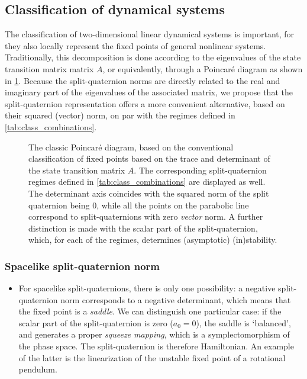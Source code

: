 \subsection{Classification of dynamical systems}
The classification of two-dimensional linear dynamical systems is important, for they also locally represent the fixed points of general nonlinear systems. Traditionally, this decomposition is done according to the eigenvalues of the state transition matrix matrix $A$, or equivalently, through a Poincaré diagram as shown in \cref{fig:poincare_diagram}. Because the split-quaternion norms are directly related to the real and imaginary part of the eigenvalues of the associated matrix, we propose that the split-quaternion representation offers a more convenient alternative, based on their squared (vector) norm, on par with the regimes defined in \cref{tab:class_combinations}.
\begin{figure}[ht!]
    \centering
    
    \caption{The classic Poincaré diagram, based on the conventional classification of fixed points based on the trace and determinant of the state transition matrix $A$. The corresponding split-quaternion regimes defined in \cref{tab:class_combinations} are displayed as well. The determinant axis coincides with the squared norm of the split quaternion being 0, while all the points on the parabolic line correspond to split-quaternions with zero \emph{vector} norm. A further distinction is made with the scalar part of the split-quaternion, which, for each of the regimes, determines (asymptotic) (in)stability.}
    \label{fig:poincare_diagram}
\end{figure}

\subsubsection*{Spacelike split-quaternion norm}
    \begin{itemize}
        \item[\circled{1}] For spacelike split-quaternions, there is only one possibility: a negative split-quaternion norm corresponds to a negative determinant, which means that the fixed point is a \emph{saddle}. We can distinguish one particular case: if the scalar part of the split-quaternion is zero ($a_0 = 0$), the saddle is `balanced', and generates a proper \emph{squeeze mapping}, which is a symplectomorphism of the phase space. The split-quaternion is therefore Hamiltonian. An example of the latter is the linearization of the unstable fixed point of a rotational pendulum.
    \end{itemize}

